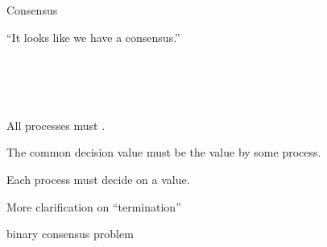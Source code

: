 \begin{frame}{}
  \centerline{\LARGE Consensus}

  \vspace{0.50cm}

  \vspace{-0.30cm} 
  \centerline{``It looks like we have a consensus.''}　
\end{frame}


\begin{frame}{}
  \begin{columns}
      \centerline{\qquad\qquad \Large \bf {}}
      \centerline{\Large \bf {}\qquad\qquad}
  \end{columns}

  \pause
  \vspace{0.50cm}
  \begin{definition}
    \begin{description}
      \setlength{\itemsep}{5pt}
      \item[Agreement] All  processes must .
      \item[Validity] The common decision value must be the value  by some process.
      \item[Termination] Each  process must  decide on a value.
    \end{description}
  \end{definition}
\end{frame}

\begin{frame}{}
  More clarification on ``termination''

  binary consensus problem
\end{frame}

